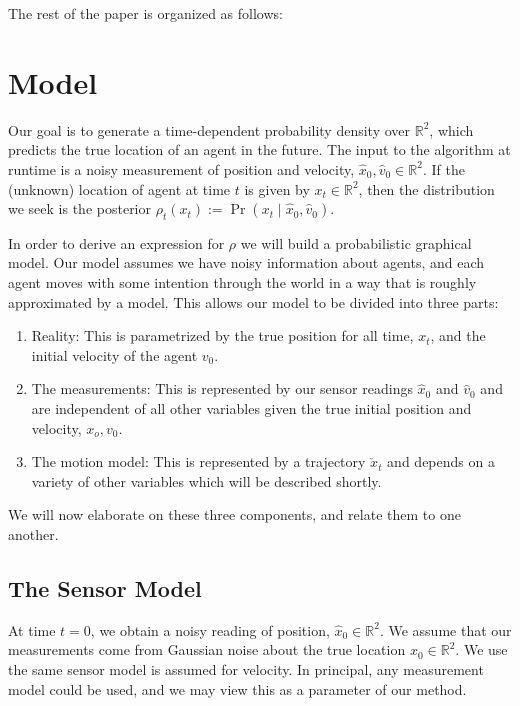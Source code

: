 \documentclass[conference]{IEEEtran}
\begin{document}
The rest of the paper is organized as follows:

\section{Model}


Our goal is to generate a time-dependent probability density over $\mathbb{R}^2$, which predicts the true location of an agent in the future.
The input to the algorithm at runtime is a noisy measurement of position and velocity, $\hat{x}_0, \hat{v}_0 \in \mathbb{R}^2$.
If the (unknown) location of agent at time $t$ is given by $x_t \in \mathbb{R}^2$, then the distribution we seek is the posterior $\rho_t(x_t) := \Pr( x_t \mid \hat{x}_0, \hat{v}_0 )$.

In order to derive an expression for $\rho$ we will build a probabilistic graphical model.
Our model assumes we have noisy information about agents, and each agent moves with some intention through the world in a way that is roughly approximated by a model.
This allows our model to be divided into three parts:
\begin{enumerate}
	\item Reality:  This is parametrized by the true position for all time, $x_t$, and the initial velocity of the agent $v_0$.
	\item The measurements:  This is represented by our sensor readings $\hat{x}_0$ and $\hat{v}_0$ and are independent of all other variables given the true initial position and velocity, $x_o, v_0$.
	\item The motion model:  This is represented by a trajectory $\check{x}_t$ and depends on a variety of other variables which will be described shortly.
\end{enumerate}
We will now elaborate on these three components, and relate them to one another.

\subsection{The Sensor Model}
At time $t=0$, we obtain a noisy reading of position, $\hat{x}_0 \in \mathbb{R}^2$.
We assume that our measurements come from Gaussian noise about the true location $x_0 \in \mathbb{R}^2$.
We use the same sensor model is assumed for velocity.
In principal, any measurement model could be used, and we may view this as a parameter of our method.
\end{document}

